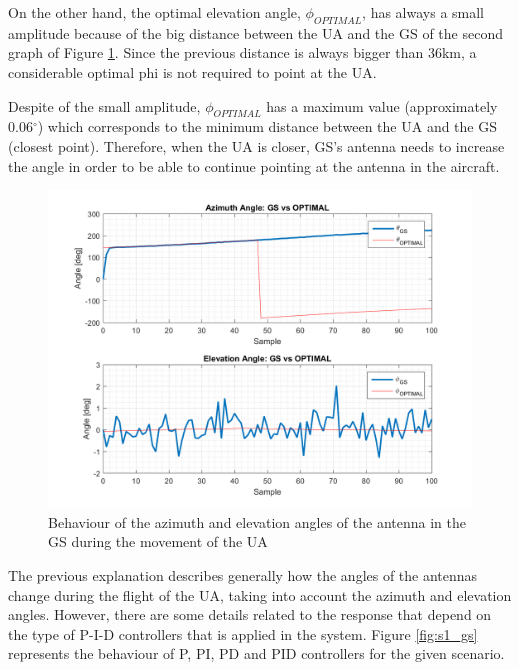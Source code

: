 On the other hand, the optimal elevation angle, $\phi_{OPTIMAL}$, has always a small amplitude because of the big distance between the UA and the GS of the second graph of Figure \ref{fig:s1_pd_gs_alone}. Since the previous distance is always bigger than 36km, a considerable optimal phi is not required to point at the UA. 

Despite of the small amplitude, $\phi_{OPTIMAL}$ has a maximum value (approximately 0.06$^{\circ}$) which corresponds to the minimum distance between the UA and the GS (closest point). Therefore, when the UA is closer, GS’s antenna needs to increase the angle in order to be able to continue pointing at the antenna in the aircraft.

\begin{figure}[H]
	\centering
	\includegraphics[scale=0.75]{figures/s1_pd_gs.png}
	\caption{Behaviour of the azimuth and elevation angles of the antenna in the GS during the movement of the UA}
	\label{fig:s1_pd_gs_alone}
\end{figure}

The previous explanation describes generally how the angles of the antennas change during the flight of the UA, taking into account the azimuth and elevation angles. However, there are some details related to the response that depend on the type of P-I-D controllers that is applied in the system. Figure \ref{fig:s1_gs} represents the behaviour of P, PI, PD and PID controllers for the given scenario.

